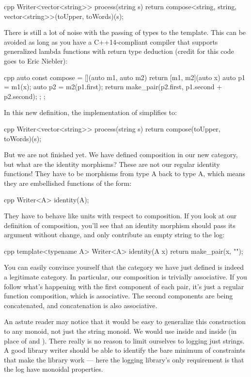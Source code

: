 \begin{snip}{cpp}
Writer<vector<string>> process(string s) {
    return compose<string, string, vector<string>>(toUpper, toWords)(s);
}
\end{snip}
There is still a lot of noise with the passing of types to the
 template. This can be avoided as long as you have a
C++14-compliant compiler that supports generalized lambda functions with
return type deduction (credit for this code goes to Eric Niebler):

\begin{snip}{cpp}
auto const compose = [](auto m1, auto m2) {
    return [m1, m2](auto x) {
        auto p1 = m1(x);
        auto p2 = m2(p1.first);
        return make_pair(p2.first, p1.second + p2.second);
    };
};
\end{snip}
In this new definition, the implementation of 
simplifies to:

\begin{snip}{cpp}
Writer<vector<string>> process(string s) {
    return compose(toUpper, toWords)(s);
}
\end{snip}
But we are not finished yet. We have defined composition in our new
category, but what are the identity morphisms? These are not our regular
identity functions! They have to be morphisms from type A back to type
A, which means they are embellished functions of the form:

\begin{snip}{cpp}
Writer<A> identity(A);
\end{snip}
They have to behave like units with respect to composition. If you look
at our definition of composition, you'll see that an identity morphism
should pass its argument without change, and only contribute an empty
string to the log:

\begin{snip}{cpp}
template<typename A>
Writer<A> identity(A x) {
    return make_pair(x, "");
}
\end{snip}
You can easily convince yourself that the category we have just defined
is indeed a legitimate category. In particular, our composition is
trivially associative. If you follow what's happening with the first
component of each pair, it's just a regular function composition, which
is associative. The second components are being concatenated, and
concatenation is also associative.

An astute reader may notice that it would be easy to generalize this
construction to any monoid, not just the string monoid. We would use
 inside  and  inside
 (in place of \code{+} and ). There really
is no reason to limit ourselves to logging just strings. A good library
writer should be able to identify the bare minimum of constraints that
make the library work --- here the logging library's only requirement is
that the log have monoidal properties.

